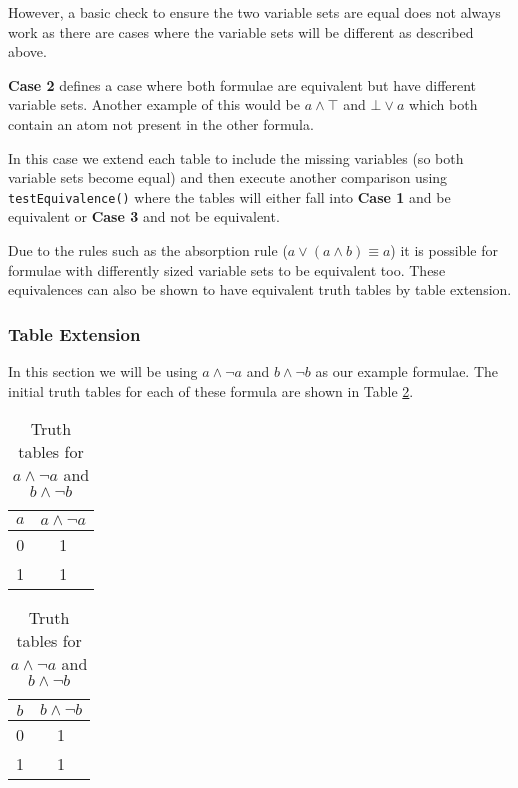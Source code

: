 \documentclass{report}
\begin{document}
However, a basic check to ensure the two variable sets are equal does not always work as there are cases where the variable sets will be different as described above. 

\textbf{Case 2} defines a case where both formulae are equivalent but have different variable sets. Another example of this would be $a\land\top$ and $\bot\lor a$ which both contain an atom not present in the other formula.

In this case we extend each table to include the missing variables (so both variable sets become equal) and then execute another comparison using {\tt testEquivalence()} where the tables will either fall into \textbf{Case 1} and be equivalent or \textbf{Case 3} and not be equivalent. 

Due to the rules such as the absorption rule ($a \lor (a \land b) \equiv a$) it is possible for formulae with differently sized variable sets to be equivalent too. These equivalences can also be shown to have equivalent truth tables by table extension.

\subsubsection{Table Extension}

In this section we will be using $a \land \lnot a$ and $b \land \lnot b$ as our example formulae. The initial truth tables for each of these formula are shown in Table \ref{table:a_and_not_a}.

\begin{table}[h]
  \begin{center}
\begin{tabular}{ | c || c | }
      \hline
      $a$ & $a \land \lnot a$ \\ \hline
      0 & 1 \\
      1 & 1 \\
      \hline
\end{tabular}
\hspace{15mm}
\begin{tabular}{ | c || c | }
      \hline
      $b$ & $b \land \lnot b$ \\ \hline
      0 & 1 \\
      1 & 1 \\
      \hline
\end{tabular}
  \end{center}
  \caption{Truth tables for $a \land \lnot a$ and $b \land \lnot b$}
  \label{table:a_and_not_a}
\end{table}
\end{document}
